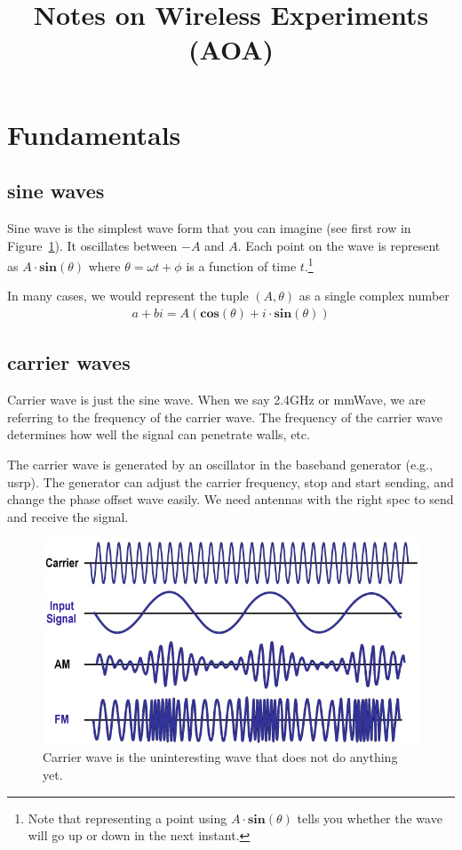 \documentclass[10pt]{article}
\begin{document}
\title{Notes on Wireless Experiments (AOA)}
\maketitle

\section{Fundamentals}

\subsection{sine waves}
Sine wave is the simplest wave form that you can imagine (see first row in Figure~\ref{fig:carrier}).  It oscillates between $-A$ and $A$.  Each point on the wave is represent as $A\cdot \textbf{sin}(\theta)$ where $\theta = \omega t + \phi$ is a function of time $t$.\footnote{Note that representing a point using $A\cdot \textbf{sin}(\theta)$ tells you whether the wave will go up or down in the next instant.}

In many cases, we would represent the tuple $(A, \theta)$ as a single complex number 
\begin{align} 
a + bi = A(\textbf{cos}(\theta)+i\cdot\textbf{sin}(\theta))
\label{eq:complex}
\end{align} 

\subsection{carrier waves}
Carrier wave is just the sine wave.  When we say 2.4GHz or mmWave, we are referring to the frequency of the carrier wave.  The frequency of the carrier wave determines how well the signal can penetrate walls, etc.

The carrier wave is generated by an oscillator in the baseband generator (e.g., usrp).  The generator can adjust the carrier frequency, stop and start sending, and change the phase offset wave easily.  We need antennas with the right spec to send and receive the signal.


\begin{figure}[h!]
\begin{center}
\includegraphics[width=0.6\linewidth]{figs/carrier}
\end{center}
\caption{Carrier wave is the uninteresting wave that does not do anything yet.}
\label{fig:carrier}
\end{figure}
\end{document}
